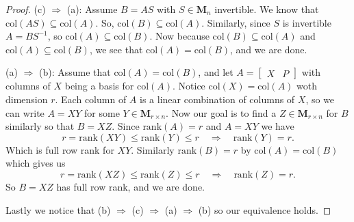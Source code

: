 \documentclass[12pt]{amsart}
\begin{document}
\begin{onehalfspace}
\begin{proof}
            (c) $\Rightarrow$ (a): Assume $B=AS$ with $S\in\mathbf{M}_n$ invertible.
            We know that $\text{col}(AS)\subseteq\text{col}(A)$.
            So, $\text{col}(B)\subseteq\text{col}(A)$.
            Similarly, since $S$ is invertible $A = BS^{-1}$, so $\text{col}(A)\subseteq\text{col}(B)$.
            Now because $\text{col}(B)\subseteq\text{col}(A)$ and $\text{col}(A)\subseteq\text{col}(B)$, we see that
            $\text{col}(A)=\text{col}(B)$, and we are done.

            (a) $\Rightarrow$ (b): Assume that $\text{col}(A)=\text{col}(B)$, and let $A = \left[\begin{matrix}X & P\end{matrix}\right]$
            with columns of $X$ being a basis for $\text{col}(A)$.
            Notice $\text{col}(X) = \text{col}(A)$ woth dimension $r$.
            Each column of $A$ is a linear combination of columns of $X$, so we can write $A=XY$ for some
            $Y\in\mathbf{M}_{r\times n}$.
            Now our goal is to find a $Z\in\mathbf{M}_{r\times n}$ for $B$ similarly so that $B=XZ$.
            Since $\text{rank}(A)=r$ and $A=XY$ we have
            \begin{displaymath}
                r = \text{rank}(XY) \le \text{rank}(Y) \le r \quad\Rightarrow\quad \text{rank}(Y)=r.
            \end{displaymath}
            Which is full row rank for $XY$.
            Similarly $\text{rank}(B) = r$ by $\text{col}(A)=\text{col}(B)$ which gives us
            \begin{displaymath}
                r = \text{rank}(XZ) \le \text{rank}(Z) \le r \quad\Rightarrow\quad \text{rank}(Z)=r.
            \end{displaymath}
            So $B=XZ$ has full row rank, and we are done.

            Lastly we notice that (b) $\Rightarrow$ (c) $\Rightarrow$ (a) $\Rightarrow$ (b) so our equivalence holds.
        \end{proof}


\end{onehalfspace}
\end{document}
